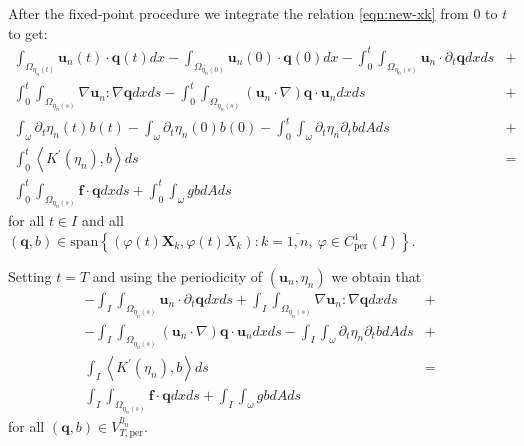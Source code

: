 \documentclass[10pt,a4paper]{article}
\numberwithin{equation}{section}
\begin{document}
After the fixed-point procedure we integrate  the relation \eqref{eqn:new-xk} from $0$ to $t$ to get:
\begin{equation}\label{eqn:chap02-discrete-integrated-t}
\begin{aligned}\int_{\Omega_{\eta_{n}\left(t\right)}}\mathbf{u}_{n}\left(t\right)\cdot\mathbf{q}\left(t\right)dx-\int_{\Omega_{\eta_{n}\left(0\right)}}\mathbf{u}_{n}\left(0\right)\cdot\mathbf{q}\left(0\right)dx-\int_{0}^{t}\int_{\Omega_{\eta_{n}\left(s\right)}}\mathbf{u}_{n}\cdot\partial_{t}\mathbf{q}dxds & +\\
\int_{0}^{t}\int_{\Omega_{\eta_{n}\left(s\right)}}\nabla\mathbf{u}_{n}:\nabla\mathbf{q}dxds-\int_{0}^{t}\int_{\Omega_{\eta_{n}\left(s\right)}}\left(\mathbf{u}_{n}\cdot\nabla\right)\mathbf{q}\cdot\mathbf{u}_{n}dxds & +\\
\int_{\omega}\partial_{t}\eta_{n}\left(t\right)b\left(t\right)-\int_{\omega}\partial_{t}\eta_{n}\left(0\right)b\left(0\right)-\int_{0}^{t}\int_{\omega}\partial_{t}\eta_{n}\partial_{t}bdAds & +\\
\int_{0}^{t}\left\langle K^{\prime}\left(\eta_{n}\right),b\right\rangle ds & =\\
\int_{0}^{t}\int_{\Omega_{\eta_{n}\left(s\right)}}\mathbf{f}\cdot\mathbf{q}dxds+\int_{0}^{t}\int_{\omega}gbdAds
\end{aligned}
\end{equation} 
for  all $t\in I$ and all $\left(\mathbf{q},b\right)\in\text{span}\left\{ \left(\varphi\left(t\right)\mathbf{X}_{k},\varphi\left(t\right)X_{k}\right):k=\overline{1,n},\ \varphi\in C_{\text{per}}^{1}\left(I\right)\right\}$.

Setting $t=T$ and using the periodicity of $(\mathbf{u}_n, \eta_n)$ we obtain that
\begin{equation}\label{eqn:chap02-discrete-integrated}
\begin{aligned}-\int_{I}\int_{\Omega_{\eta_{n}\left(s\right)}}\mathbf{u}_{n}\cdot\partial_{t}\mathbf{q}dxds+\int_{I}\int_{\Omega_{\eta_{n}\left(s\right)}}\nabla\mathbf{u}_{n}:\nabla\mathbf{q}dxds & +\\
-\int_{I}\int_{\Omega_{\eta_{n}\left(s\right)}}\left(\mathbf{u}_{n}\cdot\nabla\right)\mathbf{q}\cdot\mathbf{u}_{n}dxds-\int_{I}\int_{\omega}\partial_{t}\eta_{n}\partial_{t}bdAds & +\\
\int_{I}\left\langle K^{\prime}\left(\eta_{n}\right),b\right\rangle ds & =\\
\int_{I}\int_{\Omega_{\eta_{n}\left(s\right)}}\mathbf{f}\cdot\mathbf{q}dxds+\int_{I}\int_{\omega}gbdAds
\end{aligned}
\end{equation}
for all $\left(\mathbf{q},b\right)\in V_{T,\text{per}}^{\eta_{n}}$.
\end{document}
